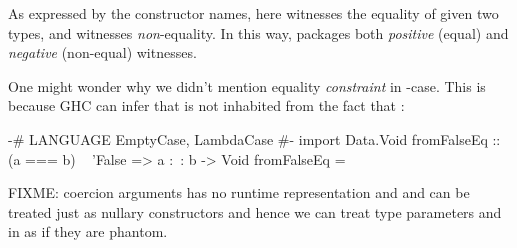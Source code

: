 \documentclass[demotion-paper.tex]{subfiles}
\begin{document}
As expressed by the constructor names, here  witnesses the equality of given two types, and  witnesses \emph{non}-equality.
In this way,  packages both \emph{positive} (equal) and \emph{negative} (non-equal) witnesses.

One might wonder why we didn't mention equality \emph{constraint}  in -case.
This is because GHC can infer that  is not inhabited from the fact that :

\begin{code}
{-# LANGUAGE EmptyCase, LambdaCase #-}
import Data.Void
fromFalseEq :: (a === b) ~ 'False => a :~: b -> Void
fromFalseEq = \case {}
\end{code}

FIXME: coercion arguments has no runtime representation and {} and {} can be treated just as nullary constructors and hence we can treat type parameters {} and {} in {} as if they are phantom.
\end{document}
